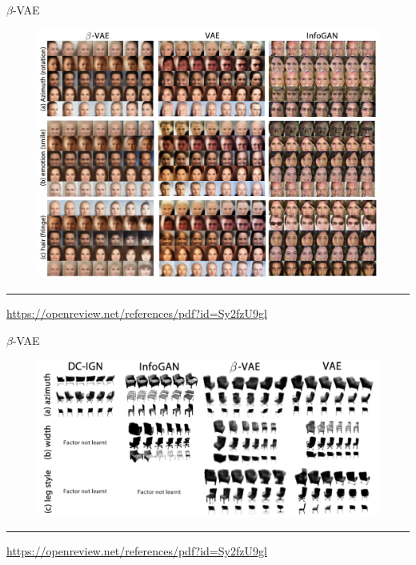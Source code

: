 \documentclass{beamer}
\begin{document}
\begin{frame}{$\beta$-VAE}
\begin{figure}
    \centering
    \includegraphics[width=0.95\linewidth]{figs/betaVAE_1.png}
\end{figure}
\vfill
\hrule\medskip
{\scriptsize \href{https://openreview.net/references/pdf?id=Sy2fzU9gl}{https://openreview.net/references/pdf?id=Sy2fzU9gl}}
\end{frame}
\begin{frame}{$\beta$-VAE}
\vspace{1cm}
\begin{figure}
    \centering
    \includegraphics[width=\linewidth]{figs/betaVAE_2.png}
\end{figure}
\vspace{1cm}
\vfill
\hrule\medskip
{\scriptsize \href{https://openreview.net/references/pdf?id=Sy2fzU9gl}{https://openreview.net/references/pdf?id=Sy2fzU9gl}}
\end{frame}
\end{document}
